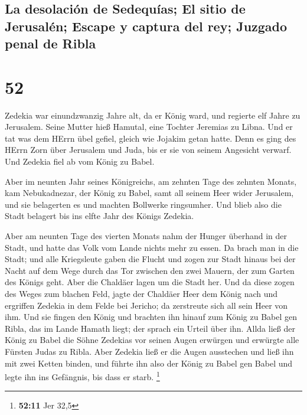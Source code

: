 \hypertarget{la-desolaciuxf3n-de-sedequuxedas-el-sitio-de-jerusaluxe9n-escape-y-captura-del-rey-juzgado-penal-de-ribla}{%
\subsection{La desolación de Sedequías; El sitio de Jerusalén; Escape y
captura del rey; Juzgado penal de
Ribla}\label{la-desolaciuxf3n-de-sedequuxedas-el-sitio-de-jerusaluxe9n-escape-y-captura-del-rey-juzgado-penal-de-ribla}}

\hypertarget{section-51}{%
\section{52}\label{section-51}}

 Zedekia war einundzwanzig Jahre alt, da er König ward,
und regierte elf Jahre zu Jerusalem. Seine Mutter hieß Hamutal, eine
Tochter Jeremias zu Libna.  Und er tat was dem HErrn übel
gefiel, gleich wie Jojakim getan hatte.  Denn es ging des
HErrn Zorn über Jerusalem und Juda, bis er sie von seinem Angesicht
verwarf. Und Zedekia fiel ab vom König zu Babel.

 Aber im neunten Jahr seines Königreichs, am zehnten Tage
des zehnten Monats, kam Nebukadnezar, der König zu Babel, samt all
seinem Heer wider Jerusalem, und sie belagerten es und machten Bollwerke
ringsumher.  Und blieb also die Stadt belagert bis ins
elfte Jahr des Königs Zedekia.

 Aber am neunten Tage des vierten Monats nahm der Hunger
überhand in der Stadt, und hatte das Volk vom Lande nichts mehr zu
essen.  Da brach man in die Stadt; und alle Kriegsleute
gaben die Flucht und zogen zur Stadt hinaus bei der Nacht auf dem Wege
durch das Tor zwischen den zwei Mauern, der zum Garten des Königs geht.
Aber die Chaldäer lagen um die Stadt her.  Und da diese
zogen des Weges zum blachen Feld, jagte der Chaldäer Heer dem König nach
und ergriffen Zedekia in dem Felde bei Jericho; da zerstreute sich all
sein Heer von ihm.  Und sie fingen den König und brachten
ihn hinauf zum König zu Babel gen Ribla, das im Lande Hamath liegt; der
sprach ein Urteil über ihn.  Allda ließ der König zu
Babel die Söhne Zedekias vor seinen Augen erwürgen und erwürgte alle
Fürsten Judas zu Ribla.  Aber Zedekia ließ er die Augen
ausstechen und ließ ihn mit zwei Ketten binden, und führte ihn also der
König zu Babel gen Babel und legte ihn ins Gefängnis, bis dass er starb.
\footnote{\textbf{52:11} Jer 32,5}

